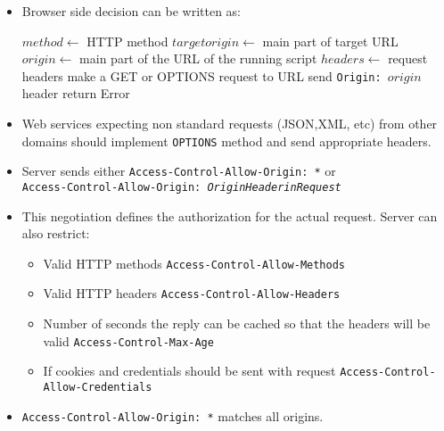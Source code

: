 \documentclass[trans,compress,xcolor=table]{beamer}
\begin{document}
\begin{frame}[fragile]
\begin{itemize}
\item
	Browser side decision can be written as:
{\scriptsize
\begin{algorithmic}
\State $method \gets$ HTTP method
\State $targetorigin \gets$ main part of target URL
\State $origin \gets$ main part of the URL of the running script
\State $headers \gets$ request headers
	\State {}
	\State make a GET or OPTIONS request to URL
	\State send \texttt{Origin: $origin$} header
		\State {}
	\Else
		\State \textcolor{red!70!black}{return Error}
	\EndIf
\EndIf
\end{algorithmic}
}
\end{itemize}
\end{frame}

\begin{frame}[fragile]
\begin{itemize}
\item Web services expecting non standard requests (JSON,XML, etc)  from other domains should
implement \lstinline!OPTIONS! method and send appropriate headers.
\item Server sends either \texttt{\small Access-Control-Allow-Origin: *} or\\
	\texttt{\small Access-Control-Allow-Origin: {\em OriginHeaderinRequest\/}}
\item This negotiation defines the authorization for the actual request.
		 Server can also restrict:
	\begin{itemize}
		\item Valid HTTP methods \texttt{\small Access-Control-Allow-Methods}
		\item Valid HTTP headers \texttt{\small Access-Control-Allow-Headers}
		\item Number of seconds the reply can be cached so that the headers will be valid
		\texttt{\small Access-Control-Max-Age}
		\item If cookies and credentials should be sent with request
			\texttt{\small Access-Control-Allow-Credentials}
	\end{itemize}
\item  \texttt{\small Access-Control-Allow-Origin: *} matches all origins.
\end{itemize}
\end{frame}
\end{document}
